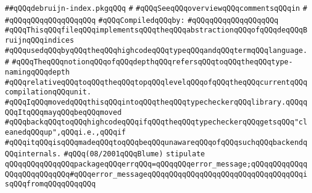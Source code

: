 \label{src/lib/compiler/front/typer/basics/debruijn-index.pkg}
\verb|##qQQqdebruijn-index.pkgqQQq|\newline
\verb|#|\newline
\verb|#qQQqSeeqQQqoverviewqQQqcommentsqQQqin|\newline
\verb|#|\newline
\verb|#qQQqqQQqqQQqqQQqqQQq|\newline
\newline
\verb|#qQQqCompiledqQQqby:|\newline
\verb|#qQQqqQQqqQQqqQQqqQQq|\newline
\newline
\verb|#qQQqThisqQQqfileqQQqimplementsqQQqtheqQQqabstractionqQQqofqQQqdeqQQqBruijnqQQqindices|\newline
\verb|#qQQqusedqQQqbyqQQqtheqQQqhighcodeqQQqtypeqQQqandqQQqtermqQQqlanguage.|\newline
\verb|#|\newline
\verb|#qQQqTheqQQqnotionqQQqofqQQqdepthqQQqrefersqQQqtoqQQqtheqQQqtype-namingqQQqdepth|\newline
\verb|#qQQqrelativeqQQqtoqQQqtheqQQqtopqQQqlevelqQQqofqQQqtheqQQqcurrentqQQqcompilationqQQqunit.|\newline
\newline
\newline
\newline
\verb|#qQQqIqQQqmovedqQQqthisqQQqintoqQQqtheqQQqtypecheckerqQQqlibrary.qQQqqQQqItqQQqmayqQQqbeqQQqmoved|\newline
\verb|#qQQqbackqQQqtoqQQqhighcodeqQQqifqQQqtheqQQqtypecheckerqQQqgetsqQQq"cleanedqQQqup",qQQqi.e.,qQQqif|\newline
\verb|#qQQqitqQQqisqQQqmadeqQQqtoqQQqbeqQQqunawareqQQqofqQQqsuchqQQqbackendqQQqinternals.|\newline
\verb|#qQQq(08/2001qQQqBlume)|\newline
\newline
\verb|stipulate|\newline
\verb|qQQqqQQqqQQqqQQqpackageqQQqerrqQQq=qQQqqQQqerror_message;qQQqqQQqqQQqqQQqqQQqqQQqqQQq#qQQqerror_messageqQQqqQQqqQQqqQQqqQQqqQQqqQQqqQQqqQQqisqQQqfromqQQqqQQqqQQq|\newline
